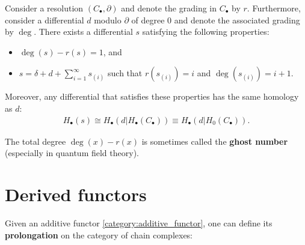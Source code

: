     \begin{theorem}\label{homalg:homological_perturbation}
        Consider a resolution $(C_\bullet,\partial)$ and denote the grading in $C_\bullet$ by $r$. Furthermore, consider a differential $d$ modulo $\partial$ of degree 0 and denote the associated grading by $\deg$. There exists a differential $s$ satisfying the following properties:
        \begin{itemize}
            \item $\deg(s) - r(s) = 1$, and
            \item $s = \delta + d + \sum_{i=1}^\infty s_{(i)}$ such that $r(s_{(i)})=i$ and $\deg(s_{(i)}) = i+1$.
        \end{itemize}
        Moreover, any differential that satisfies these properties has the same homology as $d$:
        \begin{gather}
            H_\bullet(s)\cong H_\bullet(d|H_\bullet(C_\bullet))\equiv H_\bullet(d|H_0(C_\bullet)).
        \end{gather}
    \end{theorem}
    \begin{remark}
        The total degree $\deg(x)-r(x)$ is sometimes called the \textbf{ghost number} (especially in quantum field theory).
    \end{remark}

\section{Derived functors}

	Given an additive functor \ref{category:additive_functor}, one can define its \textbf{prolongation} on the category of chain complexes:

